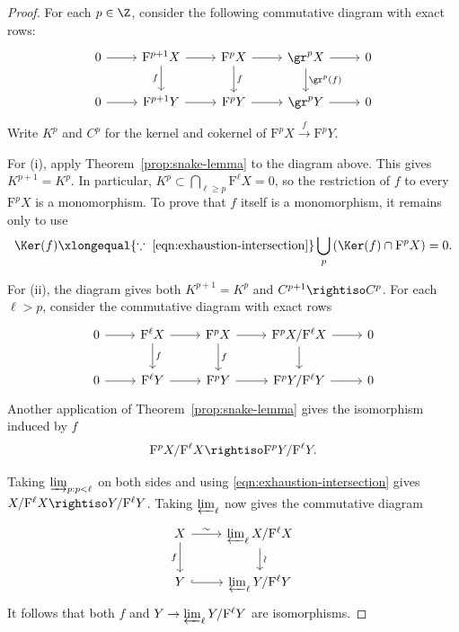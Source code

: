 \begin{proof}
	For each $p\in\Z$, consider the following commutative diagram with exact
	rows:
	\[\begin{tikzcd}
		0 \arrow[r] & \mathrm{F}^{p+1} X \arrow[d, "f"'] \arrow[r] & \mathrm{F}^p X \arrow[r] \arrow[d, "f"] & \gr^p X \arrow[r] \arrow[d, "{\gr^p(f)}"] & 0 \\
		0 \arrow[r] & \mathrm{F}^{p+1} Y \arrow[r] & \mathrm{F}^p Y \arrow[r] & \gr^p Y \arrow[r] & 0
	\end{tikzcd}\]
	Write $K^p$ and $C^p$ for the kernel and cokernel of
	$\mathrm{F}^pX\xrightarrow{f}\mathrm{F}^pY$.

	For (i), apply Theorem~\ref{prop:snake-lemma} to the diagram above. This gives
	$K^{p+1}=K^p$. In particular,
	$K^p\subset\bigcap_{\ell\geq p}\mathrm{F}^\ell X=0$, so the restriction of
	$f$ to every $\mathrm{F}^pX$ is a monomorphism. To prove that $f$ itself is a
	monomorphism, it remains only to use
	\[ \Ker(f) \xlongequal{\because\; \text{\eqref{eqn:exhaustion-intersection}}} \bigcup_p \left( \Ker(f) \cap \mathrm{F}^p X \right) = 0. \]

	For (ii), the diagram gives both $K^{p+1}=K^p$ and
	$C^{p+1}\rightiso C^p$. For each $\ell>p$, consider the commutative diagram
	with exact rows
	\[\begin{tikzcd}
		0 \arrow[r] & \mathrm{F}^{\ell} X \arrow[r] \arrow[d, "f"] & \mathrm{F}^p X \arrow[r] \arrow[d, "f"] & \mathrm{F}^p X / \mathrm{F}^{\ell} X \arrow[r] \arrow[d] & 0 \\
		0 \arrow[r] & \mathrm{F}^{\ell} Y \arrow[r] & \mathrm{F}^p Y \arrow[r] & \mathrm{F}^p Y / \mathrm{F}^{\ell} Y \arrow[r] & 0
	\end{tikzcd}\]
	Another application of Theorem~\ref{prop:snake-lemma} gives the isomorphism
	induced by $f$
	\[ \mathrm{F}^p X / \mathrm{F}^\ell X \rightiso \mathrm{F}^p Y / \mathrm{F}^\ell Y. \]

	Taking $\varinjlim_{p:p<\ell}$ on both sides and using
	\eqref{eqn:exhaustion-intersection} gives
	$X/\mathrm{F}^\ell X\rightiso Y/\mathrm{F}^\ell Y$. Taking
	$\varprojlim_\ell$ now gives the commutative diagram
	\[\begin{tikzcd}
		X \arrow[r, "\sim"] \arrow[d, "f"'] & \varprojlim_\ell X/\mathrm{F}^\ell X \arrow[d, "\sim" sloped] \\
		Y \arrow[hookrightarrow, r] & \varprojlim_\ell Y/\mathrm{F}^\ell Y
	\end{tikzcd}\]
	It follows that both $f$ and
	$Y\to\varprojlim_\ell Y/\mathrm{F}^\ell Y$ are isomorphisms.
\end{proof}
